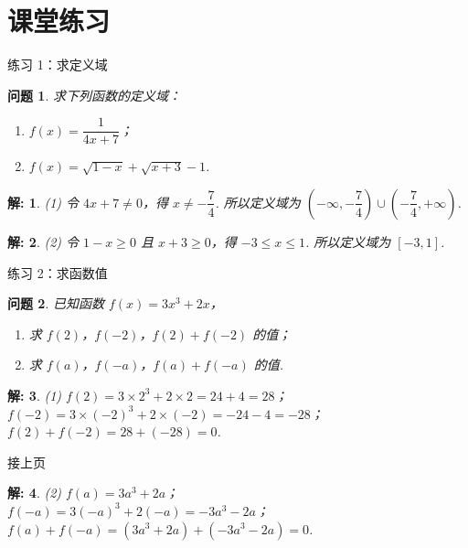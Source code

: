 \documentclass[aspectratio=169,13pt,t] {beamer}
\newtheorem{question}{问题}
\newtheorem*{solve}{解:}
\theoremstyle{definition}
\begin{document}
\section{课堂练习}

\begin{frame}{练习 1：求定义域}
	\begin{question}
	求下列函数的定义域：
	\begin{enumerate}[(1)]
		\item \(f(x) = \dfrac{1}{4x+7}\)；
		\item \(f(x) = \sqrt{1-x} + \sqrt{x+3} - 1\).
	\end{enumerate}
	\end{question}
	\pause
	\begin{solve}
		(1) 令 \(4x + 7 \neq 0\)，得 \(x \neq -\dfrac{7}{4}\). 所以定义域为 \(\left(-\infty, -\dfrac{7}{4}\right) \cup \left(-\dfrac{7}{4}, +\infty\right)\).
	\end{solve}
	\pause
	\begin{solve}
		(2) 令 \(1 - x \geqslant 0\) 且 \(x + 3 \geqslant 0\)，得 \(-3 \leqslant x \leqslant 1\). 所以定义域为 \([-3, 1]\).
	\end{solve}
\end{frame}

\begin{frame}{练习 2：求函数值}
	\begin{question}
	已知函数 \(f(x) = 3x^3 + 2x\)，
	\begin{enumerate}[(1)]
		\item 求 \(f(2)\)，\(f(-2)\)，\(f(2) + f(-2)\) 的值；
		\item 求 \(f(a)\)，\(f(-a)\)，\(f(a) + f(-a)\) 的值.
	\end{enumerate}
	\end{question}
	\pause
	\begin{solve}
		(1) \(f(2) = 3 \times 2^3 + 2 \times 2 = 24 + 4 = 28\)；\\
		\(f(-2) = 3 \times (-2)^3 + 2 \times (-2) = -24 - 4 = -28\)；\\
		\(f(2) + f(-2) = 28 + (-28) = 0\).
	\end{solve}


\end{frame}

\begin{frame}{接上页}
		\begin{solve}
		(2) \(f(a) = 3a^3 + 2a\)；\\
		\(f(-a) = 3(-a)^3 + 2(-a) = -3a^3 - 2a\)；\\
		\(f(a) + f(-a) = (3a^3 + 2a) + (-3a^3 - 2a) = 0\).
	\end{solve}
\end{frame}
\end{document}
